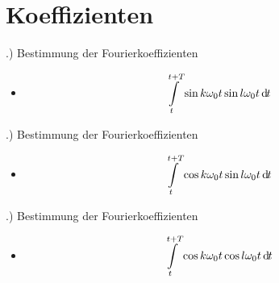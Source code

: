\documentclass[t,14pt]{beamer}
\newcommand*\diff{\mathop{}\!\mathrm{d\hspace{-1pt}}}	%
\begin{document}
\section{Koeffizienten}
\begin{frame}{\thesection .)  Bestimmung der Fourierkoeffizienten}
    \begin{itemize}
        \item \[
        \intl_t^{t+T}\sin k\omega_0 t \sin l\omega_0 t  \diff t   
        \]
        \begin{center}
            \end{center}
    \end{itemize}
\end{frame}


\begin{frame}{\thesection .)  Bestimmung der Fourierkoeffizienten}
    \begin{itemize}
        \item \[
        \intl_t^{t+T}\cos k\omega_0 t \sin l\omega_0 t  \diff t   
        \]
        \begin{center}
            \end{center}
    \end{itemize}
\end{frame}


\begin{frame}{\thesection .)  Bestimmung der Fourierkoeffizienten}
    \begin{itemize}
        \item \[
        \intl_t^{t+T}\cos k\omega_0 t \cos l\omega_0 t  \diff t   
        \]
        \begin{center}
            \end{center}
    \end{itemize}
\end{frame}


\end{document}
